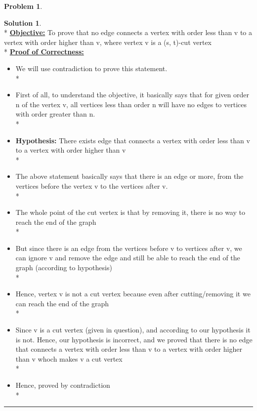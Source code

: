 \documentclass{article}
\theoremstyle{definition}
\newtheorem{problem}{Problem}
\def\fline{\rule{0.75\linewidth}{0.5pt}}
\newcommand{\finishline}{\vspace{-15pt}\begin{center}\fline\end{center}}
\newtheorem*{solution*}{Solution}
\newenvironment{solution}{\begin{solution*}}{{\finishline} \end{solution*}}
\begin{document}
\begin{problem}
\begin{enumerate}[label=(\alph*)]
\begin{solution}
\hfill \bigskip\\*
	\textbf{\underline{Objective:}} To prove that no edge connects a vertex with order less than v to a vertex with order higher than v, where vertex v is a (s, t)-cut vertex \bigskip\\*
	\textbf{\underline{Proof of Correctness:}}
		\begin{itemize}
			\item We will use contradiction to prove this statement. \\*
			\item First of all, to understand the objective, it basically says that for given order n of the vertex v, all vertices less than order n will have no edges to vertices with order greater than n. \\*
			\item \textbf{Hypothesis:} There exists edge that connects a vertex with order less than v to a vertex with order higher than v \\*
			\item The above statement basically says that there is an edge or more, from the vertices before the vertex v to the vertices after v. \\*
			\item The whole point of the cut vertex is that by removing it, there is no way to reach the end of the graph \\*
			\item But since there is an edge from the vertices before v to vertices after v, we can ignore v and remove the edge and still be able to reach the end of the graph (according to hypothesis)\\*
			\item Hence, vertex v is not a cut vertex because even after cutting/removing it we can reach the end of the graph \\*
			\item Since v is a cut vertex (given in question), and according to our hypothesis it is not. Hence, our hypothesis is incorrect, and we proved that there is no edge that connects a vertex with order less than v to a vertex with order higher than v whoch makes v a cut vertex \\*
			\item Hence, proved by contradiction \\*
	\end{itemize} 
\end{solution}


\end{enumerate}
\end{problem}
\end{document}

